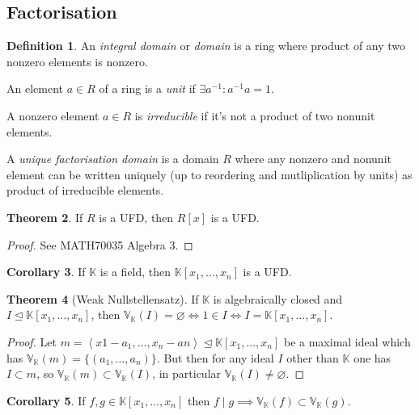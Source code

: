 \documentclass{article}
\newcommand{\K}{\mathbb{K}}
\newcommand{\V}{\mathbb{V}}
\newcommand{\la}{\left\langle}
\newcommand{\ra}{\right\rangle}
\theoremstyle{definition}
\newtheorem{defn}{Definition}[subsection]
\newtheorem{thm}[defn]{Theorem}
\newtheorem{coro}[defn]{Corollary}
\begin{document}
\subsection{Factorisation}
\begin{defn}
An \textit{integral domain} or \textit{domain} is a ring where product of any two nonzero elements is nonzero.

An element $a\in R$ of a ring is a \textit{unit} if $\exists a^{-1}:a^{-1}a=1$.

A nonzero element $a\in R$ is \textit{irreducible} if it's not a product of two nonunit elements.

A \textit{unique factorisation domain} is a domain $R$ where any nonzero and nonunit element can be written uniquely (up to reordering and mutliplication by units) as product of irreducible elements.
\end{defn}

\begin{thm}
If $R$ is a UFD, then $R[x]$ is a UFD.
\end{thm}
\begin{proof}
See MATH70035 Algebra 3.
\end{proof}

\begin{coro}
\label{coro:KfieldKxUFD}
If $\K$ is a field, then $\K[x_1,\ldots,x_n]$ is a UFD.
\end{coro}

\begin{thm}[Weak Nullstellensatz]
\label{thm:weak0stellensatz}
If $\K$ is algebraically closed and $I\unlhd\K[x_1,\ldots,x_n]$, then $\V_\K(I)=\varnothing\iff 1\in I\iff I=\K[x_1,\ldots,x_n]$.
\end{thm}
\begin{proof}
Let $m=\la x1-a_1,\ldots,x_n-an\ra\unlhd\K[x_1,\ldots,x_n]$ be a maximal ideal which has $\V_\K(m)=\{(a_1,\ldots,a_n)\}$. But then for any ideal $I$ other than $\K$ one has $I\subset m$, so $\V_\K(m)\subset\V_\K(I)$, in particular $\V_\K(I)\neq\varnothing$.
\end{proof}

\begin{coro}
\label{coro:fdivgthenVfinVg}
If $f,g\in \K[x_1,\ldots,x_n]$ then $f\mid g\implies \V_\K(f)\subset\V_\K(g)$.
\end{coro}
\end{document}
